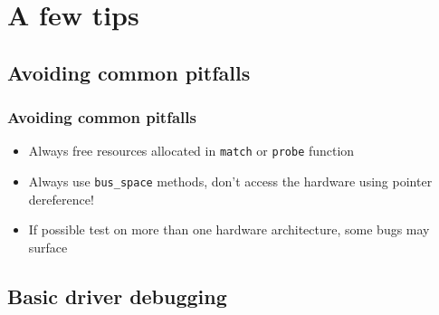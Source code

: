 \documentclass[dvipsnames,table]{beamer}
\begin{document}

\section{A few tips}

\subsection{Avoiding common pitfalls}

\begin{frame}
\frametitle{Avoiding common pitfalls}

\begin{itemize}
	\item Always free resources allocated in {\tt match} or {\tt probe} function
	\item Always use {\tt bus\_space} methods, don't access the hardware using pointer dereference!
	\item If possible test on more than one hardware architecture, some bugs may surface
\end{itemize}
\end{frame}

\subsection{Basic driver debugging}
\end{document}
